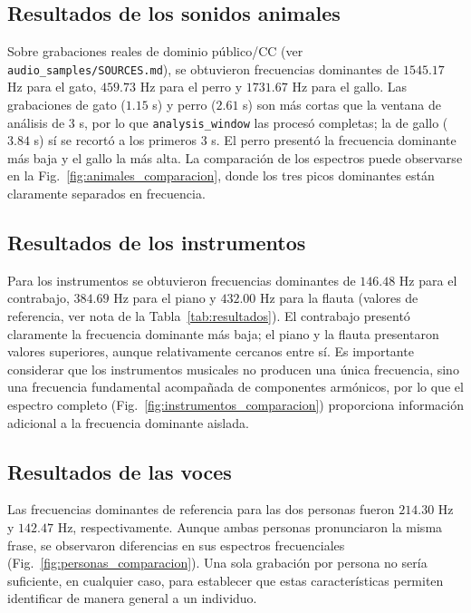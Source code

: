 \subsection{Resultados de los sonidos animales}

Sobre grabaciones reales de dominio público/CC (ver \texttt{audio\_samples/SOURCES.md}), se obtuvieron frecuencias dominantes de $1545.17$ Hz para el gato, $459.73$ Hz para el perro y $1731.67$ Hz para el gallo. Las grabaciones de gato ($1.15$ s) y perro ($2.61$ s) son más cortas que la ventana de análisis de $3$ s, por lo que \texttt{analysis\_window} las procesó completas; la de gallo ($3.84$ s) sí se recortó a los primeros $3$ s. El perro presentó la frecuencia dominante más baja y el gallo la más alta. La comparación de los espectros puede observarse en la Fig.~\ref{fig:animales_comparacion}, donde los tres picos dominantes están claramente separados en frecuencia.

\subsection{Resultados de los instrumentos}

Para los instrumentos se obtuvieron frecuencias dominantes de $146.48$ Hz para el contrabajo, $384.69$ Hz para el piano y $432.00$ Hz para la flauta (valores de referencia, ver nota de la Tabla~\ref{tab:resultados}). El contrabajo presentó claramente la frecuencia dominante más baja; el piano y la flauta presentaron valores superiores, aunque relativamente cercanos entre sí. Es importante considerar que los instrumentos musicales no producen una única frecuencia, sino una frecuencia fundamental acompañada de componentes armónicos, por lo que el espectro completo (Fig.~\ref{fig:instrumentos_comparacion}) proporciona información adicional a la frecuencia dominante aislada.

\subsection{Resultados de las voces}

Las frecuencias dominantes de referencia para las dos personas fueron $214.30$ Hz y $142.47$ Hz, respectivamente. Aunque ambas personas pronunciaron la misma frase, se observaron diferencias en sus espectros frecuenciales (Fig.~\ref{fig:personas_comparacion}). Una sola grabación por persona no sería suficiente, en cualquier caso, para establecer que estas características permiten identificar de manera general a un individuo.

